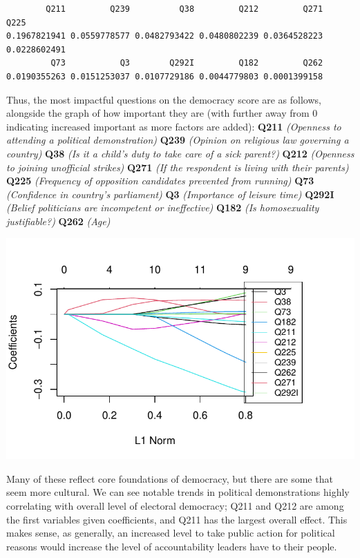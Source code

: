 \documentclass[
  letterpaper,
  DIV=11,
  numbers=noendperiod]{scrartcl}
\begin{document}
\begin{verbatim}
        Q211         Q239          Q38         Q212         Q271         Q225 
0.1967821941 0.0559778577 0.0482793422 0.0480802239 0.0364528223 0.0228602491 
         Q73           Q3        Q292I         Q182         Q262 
0.0190355263 0.0151253037 0.0107729186 0.0044779803 0.0001399158 
\end{verbatim}

Thus, the most impactful questions on the democracy score are as
follows, alongside the graph of how important they are (with further
away from 0 indicating increased important as more factors are added):
\textbf{Q211} \emph{(Openness to attending a political demonstration)}
\textbf{Q239} \emph{(Opinion on religious law governing a country)}
\textbf{Q38} \emph{(Is it a child's duty to take care of a sick
parent?)} \textbf{Q212} \emph{(Openness to joining unofficial strikes)}
\textbf{Q271} \emph{(If the respondent is living with their parents)}
\textbf{Q225} \emph{(Frequency of opposition candidates prevented from
running)} \textbf{Q73} \emph{(Confidence in country's parliament)}
\textbf{Q3} \emph{(Importance of leisure time)} \textbf{Q292I}
\emph{(Belief politicians are incompetent or ineffective)} \textbf{Q182}
\emph{(Is homosexuality justifiable?)} \textbf{Q262} \emph{(Age)}

\includegraphics{Episode_2_files/figure-pdf/lassoresults-1.pdf}

Many of these reflect core foundations of democracy, but there are some
that seem more cultural. We can see notable trends in political
demonstrations highly correlating with overall level of electoral
democracy; Q211 and Q212 are among the first variables given
coefficients, and Q211 has the largest overall effect. This makes sense,
as generally, an increased level to take public action for political
reasons would increase the level of accountability leaders have to their
people.
\end{document}
